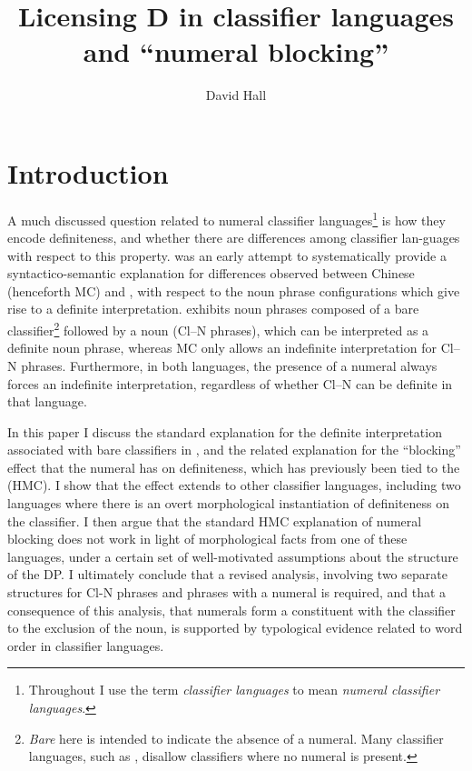 \documentclass[output=paper
,modfonts
,nonflat]{langsci/langscibook}
\title{Licensing D in classifier languages and ``numeral blocking''}
\author{David Hall\affiliation{Queen Mary University of London}}
\begin{document}
\maketitle\settowidth\jamwidth{}

\section{Introduction}

A much discussed question related to numeral classifier languages\footnote{Throughout I use the term \textit{classifier languages} to mean \textit{numeral classifier languages}.} is how they encode definiteness, and whether there are differences among classifier lan-\linebreak guages with respect to this property. \citet{ChengSybesma1999} was an early attempt to systematically provide a syntactico-semantic explanation for differen\-ces observed between  Chinese (henceforth MC) and , with respect to the noun phrase configurations which give rise to a definite interpretation.  exhibits noun phrases composed of a bare classifier\footnote{\textit{Bare} here is intended to indicate the absence of a numeral. Many classifier languages, such as , disallow classifiers where no numeral is present.} followed by a noun (Cl--N phrases), which can be interpreted as a definite noun phrase, whereas MC only allows an indefinite interpretation for Cl--N phrases. Furthermore, in both languages, the presence of a numeral always forces an indefinite interpretation, regardless of whether Cl--N can be definite in that language. 

In this paper I discuss the standard explanation for the definite interpretation associated with bare classifiers in , and the related explanation for the ``blocking'' effect that the numeral has on definiteness, which has previously been tied to the  (HMC). I show that the  effect extends to other classifier languages, including two languages where there is an overt morphological instantiation of definiteness on the classifier. I then argue that the standard HMC explanation of numeral blocking does not work in light of morphological facts from one of these languages, under a certain set of well-motivated assumptions about the structure of the DP. I ultimately conclude that a revised analysis, involving two separate structures for Cl-N phrases and phrases with a numeral is required, and that a consequence of this analysis, that numerals form a constituent with the classifier to the exclusion of the noun, is supported by typological evidence related to word order in classifier languages.
\end{document}
